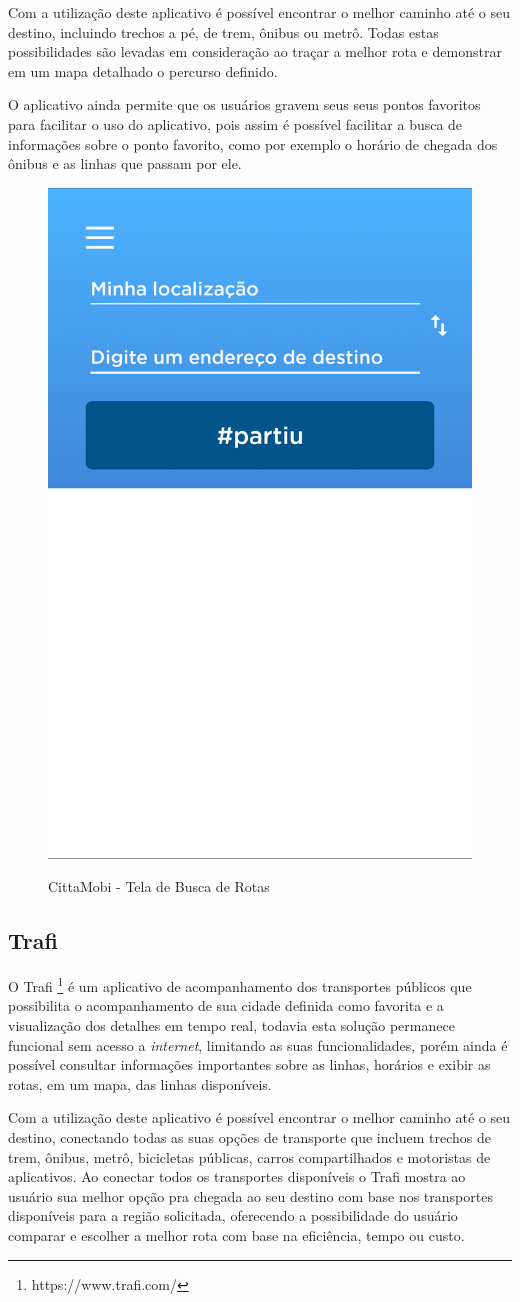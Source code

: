 Com a utilização deste aplicativo é possível encontrar o melhor caminho até o seu destino, incluindo trechos a pé, de trem, ônibus ou metrô. Todas estas possibilidades são levadas em consideração ao traçar a melhor rota e demonstrar em um mapa detalhado o percurso definido.

O aplicativo ainda permite que os usuários gravem seus seus pontos favoritos para facilitar o uso do aplicativo, pois assim é possível facilitar a busca de informações sobre o ponto favorito, como por exemplo o horário de chegada dos ônibus e as linhas que passam por ele.

\begin{figure}[H]
\caption{CittaMobi - Tela de Busca de Rotas}
\centering
\includegraphics[width=.4\textwidth]{imagens/citta-mobi.png}
\label{fig:cittamobi}
\end{figure}

\subsection{Trafi}

O Trafi \footnote{https://www.trafi.com/} é um aplicativo de acompanhamento dos transportes públicos que possibilita o acompanhamento de sua cidade definida como favorita e a visualização dos detalhes em tempo real, todavia esta solução permanece funcional sem acesso a \textit{internet}, limitando as suas funcionalidades, porém ainda é possível consultar informações importantes sobre as linhas, horários e exibir as rotas, em um mapa, das linhas disponíveis.

Com a utilização deste aplicativo é possível encontrar o melhor caminho até o seu destino, conectando todas as suas opções de transporte que incluem trechos de trem, ônibus, metrô, bicicletas públicas, carros compartilhados e motoristas de aplicativos. Ao conectar todos os transportes disponíveis o Trafi mostra ao usuário sua melhor opção pra chegada ao seu destino com base nos transportes disponíveis para a região solicitada, oferecendo a possibilidade do usuário comparar e escolher a melhor rota com base na eficiência, tempo ou custo.


